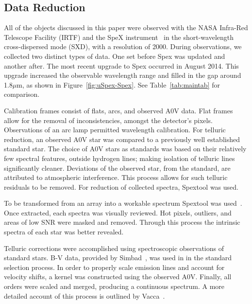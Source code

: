 \subsection{Data Reduction}


All of the objects discussed in this paper were observed with the NASA Infra-Red Telescope Facility (IRTF) and the SpeX instrument~\cite{Rayner_1998} in the short-wavelength cross-dispersed mode (SXD), with a resolution of 2000.  During observations, we collected two distinct types of data.  One set before Spex was updated and another after.  The most recent upgrade to Spex occurred in August 2014.  This upgrade increased the observable wavelength range and filled in the gap around 1.8$\mu$m, as shown in Figure~\ref{fig:uSpex-Spex}.  See Table~\ref{tab:maintab} for comparison.


Calibration frames consist of flats, arcs, and observed A0V data.  Flat frames allow for the removal of inconsistencies, amongst the detector's pixels.  Observations of an arc lamp permitted wavelength calibration.  For telluric reduction, an observed A0V star was compared to a previously well established standard star.  The choice of A0V stars as standards was based on their relatively few spectral features, outside hydrogen lines; making isolation of telluric lines significantly cleaner.  
Deviations of the observed star, from the standard, are attributed to atmospheric interference.  This process allows for such telluric residuals to be removed.  For reduction of collected spectra, Spextool was used.





To be transformed from an array into a workable spectrum Spextool was used~\cite{Cushing_2004}.  Once extracted, each spectra was visually reviewed.  Hot pixels, outliers, and areas of low SNR were masked and removed.  Through this process the intrinsic spectra of each star was better revealed.


Telluric corrections were accomplished using spectroscopic observations of standard stars. B-V data, provided by Simbad~\cite{simbad}, was used in in the standard selection process.
In order to properly scale emission lines and account for velocity shifts, a kernel was constructed using the observed A0V.  Finally, all orders were scaled and merged, producing a continuous spectrum.
A more detailed account of this process is outlined by Vacca~\cite{Vacca_2003}. 



